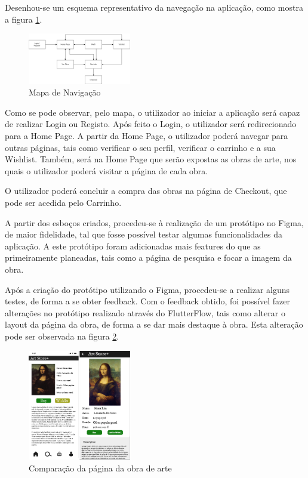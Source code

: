 \documentclass[conference]{IEEEtran}
\begin{document}
Desenhou-se um esquema representativo da navegação na aplicação, como mostra a figura \ref{fig:navmap}.

\begin{figure}[ht]
    \centering
    \includegraphics[width=0.4\textwidth]{artstore+map.drawio.png}
    \caption{Mapa de Navigação}
    \label{fig:navmap}
\end{figure}

Como se pode observar, pelo mapa, o utilizador ao iniciar a aplicação será capaz de realizar Login ou Registo. 
Após feito o Login, o utilizador será redirecionado para a Home Page. A partir da Home Page, o utilizador poderá 
navegar para outras páginas, tais como verificar o seu perfil, verificar o carrinho e a sua Wishlist. Também, 
será na Home Page que serão expostas as obras de arte, nos quais o utilizador poderá visitar a página de cada obra. 

O utilizador poderá concluir a compra das obras na página de Checkout, que pode ser acedida pelo Carrinho.

A partir dos esboços criados, procedeu-se à realização de um protótipo no Figma, de maior fidelidade, tal que 
fosse possível testar algumas funcionalidades da aplicação. A este protótipo foram adicionadas mais features do 
que as primeiramente planeadas, tais como a página de pesquisa e focar a imagem da obra.

Após a criação do protótipo utilizando o Figma, procedeu-se a realizar alguns testes, de forma a se obter feedback. 
Com o feedback obtido, foi possível fazer alterações no protótipo realizado através do FlutterFlow, tais como 
alterar o layout da página da obra, de forma a se dar mais destaque à obra. Esta alteração pode ser observada na 
figura \ref{fig:earlyvslate}.

\begin{figure}[h]
    \centering
    \includegraphics[width=0.4\textwidth]{artpiece-early-vs-latest.png}
    \caption{Comparação da página da obra de arte}
    \label{fig:earlyvslate}
\end{figure}
\end{document}
